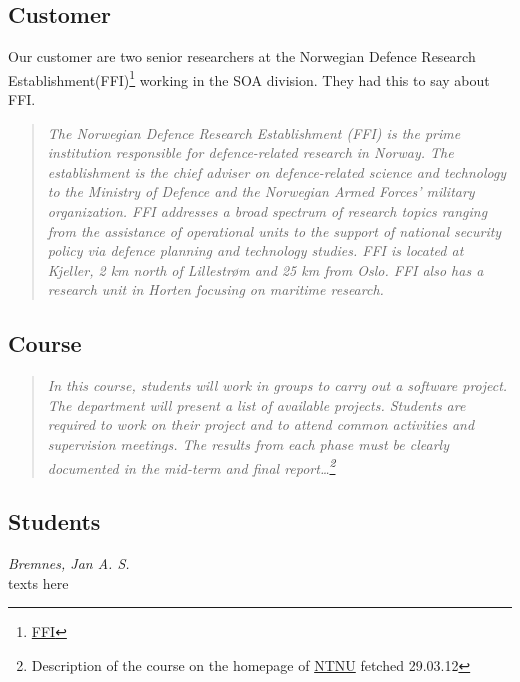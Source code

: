     \subsection{Customer}\label{Customer}
    Our customer are two senior researchers at the Norwegian Defence Research Establishment(FFI)\footnote{\href{http://www.ffi.no/no/Sider/default.aspx}{FFI}} working in the SOA division. They had this to say about FFI.
    \begin{quotation}
    \em The Norwegian Defence Research Establishment (FFI) is the prime institution responsible for defence-related research in Norway. The establishment is the chief adviser on defence-related science and technology to the Ministry of Defence and the Norwegian Armed Forces’ military organization. FFI addresses a broad spectrum of research topics ranging from the assistance of operational units to the support of national security policy via defence planning and technology studies. FFI is located at Kjeller, 2 km north of Lillestrøm and 25 km from Oslo. FFI also has a research unit in Horten focusing on maritime research.
    \end{quotation}
    
    \subsection{Course}\label{Course}
    \begin{quotation}
    \em In this course, students will work in groups to carry out a software project. The department will present a list of available projects. Students are required to work on their project and to attend common activities and supervision meetings. The results from each phase must be clearly documented in the mid-term and final report\ldots\footnote{Description of the course on the homepage of \href{http://www.ntnu.edu/studies/courses/IT2901}{NTNU} fetched 29.03.12}
    \end{quotation}
    
    \subsection{Students}\label{Students}
    
    \begin{Student}
    \indent \indent \textit{Bremnes, Jan A. S. } \\
        texts here
        \\
    \end{Student}
    
